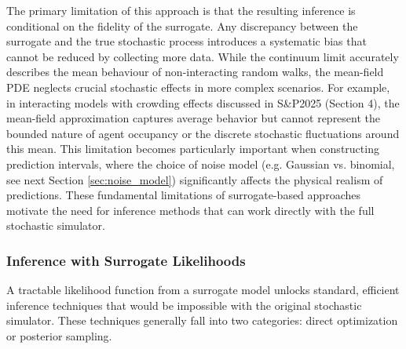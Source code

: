 \documentclass{article}
\providecommand{\DIFdelend}{} %
\DeclareRobustCommand{\DIFdelend}{\DIFOaddend \let\includegraphics\DIFOincludegraphics} %
\begin{document}
\DIFdelend The primary limitation of this approach is that the resulting inference is conditional on the fidelity of the surrogate. Any discrepancy between the surrogate and the true stochastic process introduces a systematic bias that cannot be reduced by collecting more data. While the continuum limit accurately describes the mean behaviour of non-interacting random walks, the mean-field PDE neglects crucial stochastic effects in more complex scenarios. For example, in interacting models with crowding effects discussed in S\&P2025 (Section 4), the mean-field approximation captures average behavior but cannot represent the bounded nature of agent occupancy or the discrete stochastic fluctuations around this mean. This limitation becomes particularly important when constructing prediction intervals, where the choice of noise model (e.g. Gaussian vs. binomial, see next Section \ref{sec:noise_model}) significantly affects the physical realism of predictions. These fundamental limitations of surrogate-based approaches motivate the need for inference methods that can work directly with the full stochastic simulator.



\subsubsection{Inference with Surrogate Likelihoods}
A tractable likelihood function from a surrogate model unlocks standard, efficient inference techniques that would be impossible with the original stochastic simulator. These techniques generally fall into two categories: direct optimization or posterior sampling.
\end{document}
